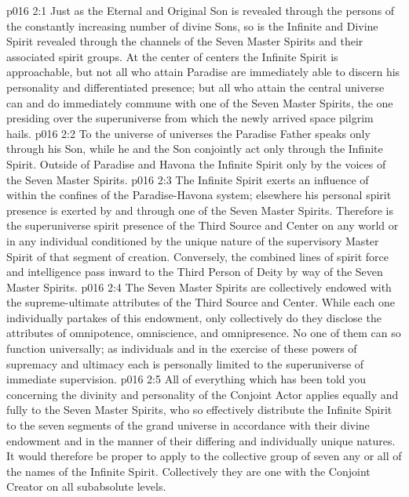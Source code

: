 \vs p016 2:1 Just as the Eternal and Original Son is revealed through the persons of the constantly increasing number of divine Sons, so is the Infinite and Divine Spirit revealed through the channels of the Seven Master Spirits and their associated spirit groups. At the center of centers the Infinite Spirit is approachable, but not all who attain Paradise are immediately able to discern his personality and differentiated presence; but all who attain the central universe can and do immediately commune with one of the Seven Master Spirits, the one presiding over the superuniverse from which the newly arrived space pilgrim hails.
\vs p016 2:2 To the universe of universes the Paradise Father speaks only through his Son, while he and the Son conjointly act only through the Infinite Spirit. Outside of Paradise and Havona the Infinite Spirit  only by the voices of the Seven Master Spirits.
\pc \vs p016 2:3 The Infinite Spirit exerts an influence of  within the confines of the Paradise\hyp{}Havona system; elsewhere his personal spirit presence is exerted by and through one of the Seven Master Spirits. Therefore is the superuniverse spirit presence of the Third Source and Center on any world or in any individual conditioned by the unique nature of the supervisory Master Spirit of that segment of creation. Conversely, the combined lines of spirit force and intelligence pass inward to the Third Person of Deity by way of the Seven Master Spirits.\plusone
\pc \vs p016 2:4 The Seven Master Spirits are collectively endowed with the supreme\hyp{}ultimate attributes of the Third Source and Center. While each one individually partakes of this endowment, only collectively do they disclose the attributes of omnipotence, omniscience, and omnipresence. No one of them can so function universally; as individuals and in the exercise of these powers of supremacy and ultimacy each is personally limited to the superuniverse of immediate supervision.
\vs p016 2:5 All of everything which has been told you concerning the divinity and personality of the Conjoint Actor applies equally and fully to the Seven Master Spirits, who so effectively distribute the Infinite Spirit to the seven segments of the grand universe in accordance with their divine endowment and in the manner of their differing and individually unique natures. It would therefore be proper to apply to the collective group of seven any or all of the names of the Infinite Spirit. Collectively they are one with the Conjoint Creator on all subabsolute levels.
